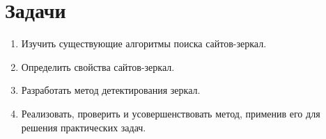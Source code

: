 \section{Задачи}
\begin{enumerate}
\item Изучить существующие алгоритмы поиска сайтов-зеркал.
\item Определить свойства сайтов-зеркал.
\item Разработать метод детектирования зеркал.
\item Реализовать, проверить и усовершенствовать метод, применив его для решения практических задач.
\end{enumerate}